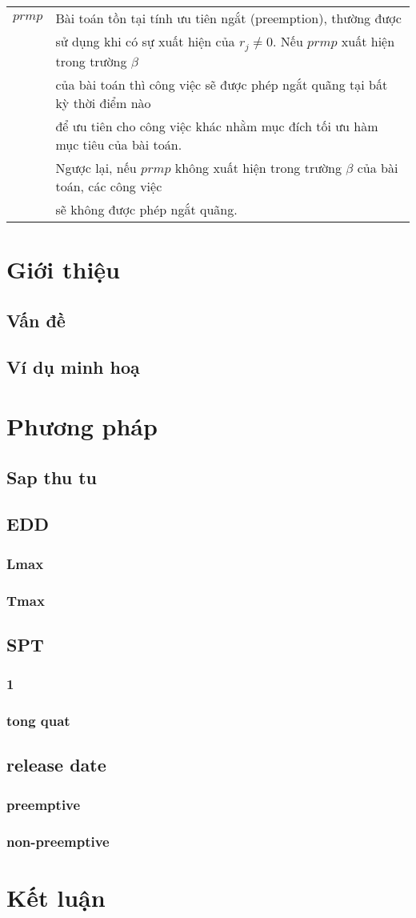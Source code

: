 \documentclass[12pt,a4paper]{report}
\begin{document}
\begin{longtable}{l l}
		$prmp$ & Bài toán tồn tại tính ưu tiên ngắt (preemption), thường được \\
		& sử dụng khi có sự xuất hiện của $r_j \neq 0$. Nếu $prmp$ xuất hiện trong trường $\beta$ \\
		& của bài toán thì công việc sẽ được phép ngắt quãng tại bất kỳ thời điểm nào \\
		& để ưu tiên cho công việc khác nhằm mục đích tối ưu hàm mục tiêu của bài toán. \\
		& Ngược lại, nếu $prmp$ không xuất hiện trong trường $\beta$ của bài toán, các công việc \\
		& sẽ không được phép ngắt quãng. \\
	\end{longtable}
\newpage

\chapter{Giới thiệu}
\section{Vấn đề}
\section{Ví dụ minh hoạ}
\chapter{Phương pháp}
\section{Sap thu tu}
\section{EDD}
\subsection{Lmax}
\subsection{Tmax}
\section{SPT}
\subsection{1}
\subsection{tong quat}
\section{release date}
\subsection{preemptive}
\subsection{non-preemptive}
\chapter{Kết luận}
\end{document}
